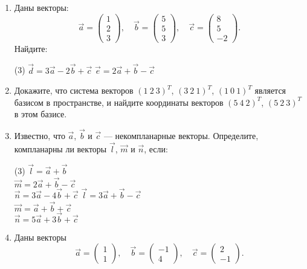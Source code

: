 \begin{enumerate}%
    \item Даны векторы:
    \[
    \vec a =
    \begin{pmatrix}
    	1 \\ 2 \\ 3
    \end{pmatrix},
    \quad
    \vec b =
    \begin{pmatrix}
    	5 \\ 5 \\ 3
    \end{pmatrix},
    \quad
    \vec c = 
	\begin{pmatrix}
    	8 \\ 5 \\ -2
    \end{pmatrix}.
   \]
   Найдите:
   \begin{tasks}(3)
       \task $\vec d = 3 \vec a -2 \vec b + \vec c$
       \task $\vec e = 2 \vec a + \vec b - \vec c$
   \end{tasks}
   
   \item Докажите, что система векторов
	    $(1\ 2\ 3)^T$,
	    $(3\ 2\ 1)^T$,
	    $(1\ 0\ 1)^T$
	    является базисом в пространстве, и найдите координаты векторов 
	    $(5\ 4\ 2)^T$,
	    $(5\ 2\ 3)^T$
	    в этом базисе.
	    
	\item Известно, что $\vec a$, $\vec b$ и $\vec c$ --- некомпланарные векторы. Определите, компланарны ли векторы $\vec l$, $\vec m$ и $\vec n$, если:
		\begin{tasks}(3)
	       \task $\vec l = \vec a + \vec b$\\
	      	 	 $\vec m = 2 \vec a + \vec b - \vec c$\\
	      	 	 $\vec n = 3 \vec a -4 \vec b + \vec c$
	       \task $\vec l = 3 \vec a + \vec b - \vec c$\\
	      	 	 $\vec m =  \vec a + \vec b + \vec c$\\
	      	 	 $\vec n = 5 \vec a +3 \vec b + \vec c$
	    \end{tasks}
	    
	\item Даны векторы
	$$\vec a = \begin{pmatrix}
	    	1 \\ 1
	    \end{pmatrix},\quad
	   \vec b = \begin{pmatrix}
	    	-1 \\ 4
	    \end{pmatrix},\quad
	    \vec c = \begin{pmatrix}
	    	2 \\ -1
	    \end{pmatrix}.$$
	  

\end{enumerate}

